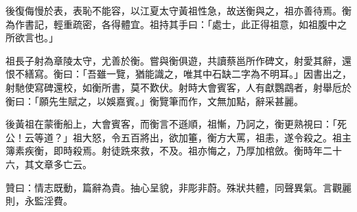\begin{pinyinscope}
後復侮慢於表，表恥不能容，以江夏太守黃祖性急，故送衡與之，祖亦善待焉。衡為作書記，輕重疏密，各得體宜。祖持其手曰：「處士，此正得祖意，如祖腹中之所欲言也。」

祖長子射為章陵太守，尤善於衡。嘗與衡俱遊，共讀蔡邕所作碑文，射愛其辭，還恨不繕寫。衡曰：「吾雖一覽，猶能識之，唯其中石缺二字為不明耳。」因書出之，射馳使寫碑還校，如衡所書，莫不歎伏。射時大會賓客，人有獻鸚鵡者，射舉卮於衡曰：「願先生賦之，以娛嘉賓。」衡覽筆而作，文無加點，辭采甚麗。

後黃祖在蒙衝船上，大會賓客，而衡言不遜順，祖慚，乃訶之，衡更熟視曰：「死公！云等道？」祖大怒，令五百將出，欲加箠，衡方大罵，祖恚，遂令殺之。祖主簿素疾衡，即時殺焉。射徒跣來救，不及。祖亦悔之，乃厚加棺斂。衡時年二十六，其文章多亡云。

贊曰：情志既動，篇辭為貴。抽心呈貌，非彫非蔚。殊狀共體，同聲異氣。言觀麗則，永監淫費。


\end{pinyinscope}